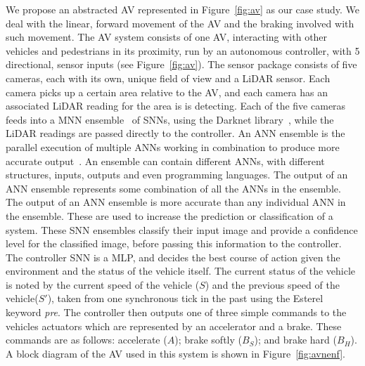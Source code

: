 We propose an abstracted \acf{AV} represented in Figure~\ref{fig:av} as our case study.
We deal with the linear, forward movement of the \ac{AV} and the braking involved with such movement.
The \ac{AV} system consists of one \acf{AV}, interacting with other vehicles and pedestrians in its proximity, run by an autonomous controller, with 5 directional, sensor inputs (see Figure~\ref{fig:av}).
The sensor package consists of five cameras, each with its own, unique field of view and a \acf{LiDAR} sensor.
Each camera picks up a certain area relative to the \ac{AV}, and each camera has an associated \ac{LiDAR} reading for the area is is detecting.
Each of the five cameras feeds into a \acf{MNN} ensemble~\cite{Maqsood2004} of \acp{SNN}, using the Darknet library~\cite{darknet13}, while the \ac{LiDAR} readings are passed directly to the controller.
An \ac{ANN} ensemble is the parallel execution of multiple \acp{ANN} working in combination to produce more accurate output~\cite{Maqsood2004}.
An ensemble can contain different \acp{ANN}, with different structures, inputs, outputs and even programming languages.
The output of an \ac{ANN} ensemble represents some combination of all the \acp{ANN} in the ensemble.
The output of an \ac{ANN} ensemble is more accurate than any individual \ac{ANN} in the ensemble.
These are used to increase the prediction or classification of a system.
These \ac{SNN} ensembles classify their input image and provide a confidence level for the classified image, before passing this information to the controller.
The controller \ac{SNN} is a \ac{MLP}, and decides the best course of action given the environment and the status of the vehicle itself. 
The current status of the vehicle is noted by the current speed of the vehicle ($S$) and the previous speed of the vehicle($S'$), taken from one synchronous tick in the past using the Esterel keyword \textit{pre}.
The controller then outputs one of three simple commands to the vehicles actuators which are represented by an accelerator and a brake.
These commands are as follows: accelerate ($A$); brake softly ($B_S$); and brake hard ($B_H$).
A block diagram of the \ac{AV} used in this system is shown in Figure~\ref{fig:avnenf}. 

